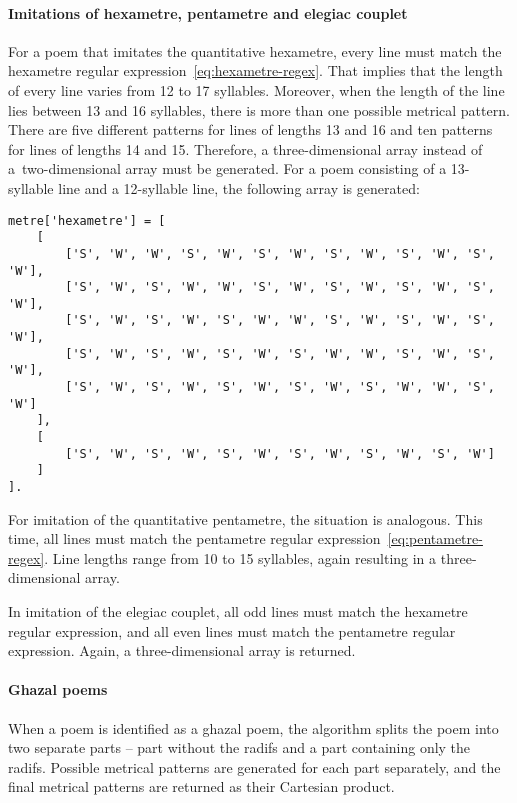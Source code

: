 \paragraph{Imitations of hexametre, pentametre and elegiac couplet}
For a poem that imitates the quantitative hexametre, every line must match the hexametre regular expression~\eqref{eq:hexametre-regex}. That implies that the length of every line varies from 12 to 17 syllables. Moreover, when the length of the line lies between 13 and 16 syllables, there is more than one possible metrical pattern. There are five different patterns for lines of lengths 13 and 16 and ten patterns for lines of lengths 14 and 15. Therefore, a three-dimensional array instead of a~two-dimensional array must be generated. For a poem consisting of a 13-syllable line and a 12-syllable line, the following array is generated:


\begin{verbatim}
metre['hexametre'] = [
    [
        ['S', 'W', 'W', 'S', 'W', 'S', 'W', 'S', 'W', 'S', 'W', 'S', 'W'],
        ['S', 'W', 'S', 'W', 'W', 'S', 'W', 'S', 'W', 'S', 'W', 'S', 'W'],
        ['S', 'W', 'S', 'W', 'S', 'W', 'W', 'S', 'W', 'S', 'W', 'S', 'W'],
        ['S', 'W', 'S', 'W', 'S', 'W', 'S', 'W', 'W', 'S', 'W', 'S', 'W'],
        ['S', 'W', 'S', 'W', 'S', 'W', 'S', 'W', 'S', 'W', 'W', 'S', 'W']
    ],
    [
        ['S', 'W', 'S', 'W', 'S', 'W', 'S', 'W', 'S', 'W', 'S', 'W']
    ]
].
\end{verbatim}

For imitation of the quantitative pentametre, the situation is analogous. This time, all lines must match the pentametre regular expression~\eqref{eq:pentametre-regex}. Line lengths range from 10 to 15 syllables, again resulting in a three-dimensional array.

In imitation of the elegiac couplet, all odd lines must match the hexametre regular expression, and all even lines must match the pentametre regular expression. Again, a three-dimensional array is returned.

\paragraph{Ghazal poems}
When a poem is identified as a ghazal poem, the algorithm splits the poem into two separate parts -- part without the radifs and a part containing only the radifs. Possible metrical patterns are generated for each part separately, and the final metrical patterns are returned as their Cartesian product.


